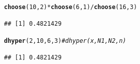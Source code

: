 \documentclass[t,xcolor=pdftex,dvipsnames,table]{beamer}
\makeatletter
\newcommand{\hlnum}[1]{\textcolor[rgb]{0.686,0.059,0.569}{#1}}%
\newcommand{\hlcom}[1]{\textcolor[rgb]{0.678,0.584,0.686}{\textit{#1}}}%
\newcommand{\hlopt}[1]{\textcolor[rgb]{0,0,0}{#1}}%
\newcommand{\hlstd}[1]{\textcolor[rgb]{0.345,0.345,0.345}{#1}}%
\newcommand{\hlkwd}[1]{\textcolor[rgb]{0.737,0.353,0.396}{\textbf{#1}}}%
\newenvironment{kframe}{%
 \def\at@end@of@kframe{}%
 \ifinner\ifhmode%
  \def\at@end@of@kframe{\end{minipage}}%
  \begin{minipage}{\columnwidth}%
 \fi\fi%
 \def\FrameCommand##1{\hskip\@totalleftmargin \hskip-\fboxsep
 \colorbox{shadecolor}{##1}\hskip-\fboxsep
     \hskip-\linewidth \hskip-\@totalleftmargin \hskip\columnwidth}%
 \MakeFramed {\advance\hsize-\width
   \@totalleftmargin\z@ \linewidth\hsize
   \@setminipage}}%
 {\par\unskip\endMakeFramed%
 \at@end@of@kframe}
\newenvironment{knitrout}{}{} %
\makeatother
\begin{document}
\begin{frame}[fragile]{}
\begin{knitrout}
\color{fgcolor}\begin{kframe}
\begin{alltt}
\hlkwd{choose}\hlstd{(}\hlnum{10}\hlstd{,}\hlnum{2}\hlstd{)}\hlopt{*}\hlkwd{choose}\hlstd{(}\hlnum{6}\hlstd{,}\hlnum{1}\hlstd{)}\hlopt{/}\hlkwd{choose}\hlstd{(}\hlnum{16}\hlstd{,}\hlnum{3}\hlstd{)}
\end{alltt}
\begin{verbatim}
## [1] 0.4821429
\end{verbatim}
\end{kframe}
\end{knitrout}

\begin{knitrout}
\color{fgcolor}\begin{kframe}
\begin{alltt}
\hlkwd{dhyper}\hlstd{(}\hlnum{2}\hlstd{,}\hlnum{10}\hlstd{,}\hlnum{6}\hlstd{,}\hlnum{3}\hlstd{)}   \hlcom{# dhyper(x,N1,N2,n)}
\end{alltt}
\begin{verbatim}
## [1] 0.4821429
\end{verbatim}
\end{kframe}
\end{knitrout}

\end{frame}
\end{document}
